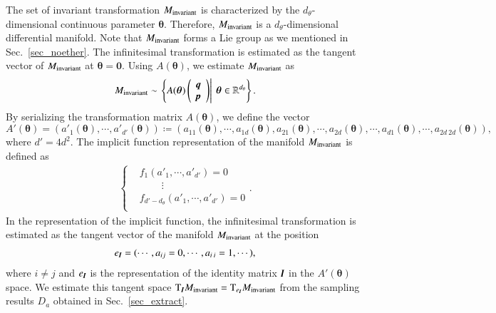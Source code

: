 \documentclass[preprint,
bibnotes,
 amsmath,amssymb,
 aps,
]{revtex4-1}
\begin{document}
The set of invariant transformation $M_{\rm invariant}$ is characterized by the $d_{\theta}$-dimensional continuous parameter $\boldsymbol{\theta}$. 
Therefore, $M_{\rm invariant}$ is a $d_{\theta}$-dimensional differential manifold. 
Note that $M_{\rm invariant}$ forms a Lie group as we mentioned in Sec.~\ref{sec_noether}. 
The infinitesimal transformation is estimated as the tangent vector of $M_{\rm invariant}$ at $\boldsymbol{\theta} = \boldsymbol{0}$. 
Using $A(\boldsymbol{\theta})$, we estimate $M_{\rm invariant}$ as
\begin{equation}
    M_{{\rm invariant}} \sim \left. \left\{A(\boldsymbol{\theta}) \left(
\begin{array}{c}
  {\textit{\textbf{q}}}\\  {\textit{\textbf{p}}}
\end{array}
\right)
\right|\:\boldsymbol{\theta} \in \mathbb{R}^{d_{\theta}}\right\}.
\end{equation}
By serializing the transformation matrix $A(\boldsymbol{\theta})$, we define the vector 
\begin{equation}
A'(\boldsymbol{\theta}) = (a'_1(\boldsymbol{\theta}),\cdots,a'_{d'}(\boldsymbol{\theta})) \coloneqq (a_{11}(\boldsymbol{\theta}),\cdots,a_{1d}(\boldsymbol{\theta}),a_{21}(\boldsymbol{\theta}),\cdots,a_{2d}(\boldsymbol{\theta}),\cdots,a_{d1}(\boldsymbol{\theta}),\cdots,a_{2d\:2d}(\boldsymbol{\theta})),
\end{equation}
where $d' = 4d^2$. 
The implicit function representation of the manifold $M_{\rm invariant}$ is defined as 
\begin{eqnarray}
\label{impeqs}
  \begin{cases}
&f_1(a'_1,\cdots,a'_{d'}) = 0\\
&\:\:\:\:\:\:\:\:\:\: \vdots\\
&f_{d'-d_{\theta}}(a'_1,\cdots,a'_{d'}) = 0\\
  \end{cases}.
\end{eqnarray}
In the representation of the implicit function, the infinitesimal transformation is estimated as the tangent vector of the manifold $M_{{\rm invariant}}$ at the position 
\begin{eqnarray}
e_{\textit{\textbf{I}}} = (\cdots,a_{ij}=0,\cdots,a_{i\:i}=1,\cdots),
\end{eqnarray}
where $i\neq j$ and $e_{\textit{\textbf{I}}}$ is the representation of the identity matrix $\textit{\textbf{I}}$ in the $A'(\boldsymbol{\theta})$ space. 
We estimate this tangent space ${\rm T}_{\textit{\textbf{I}}} M_{{\rm invariant}} = {\rm T}_{e_{\textit{\textbf{I}}}} M_{{\rm invariant}}$ from the sampling results $D_a$ obtained in Sec.~\ref{sec_extract}.\par
\end{document}
